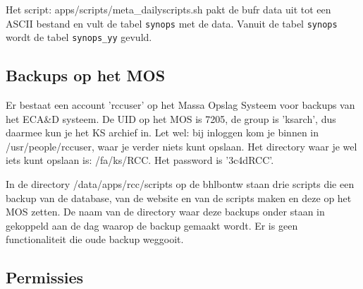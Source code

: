 \documentclass{article}
\begin{document}
Het script: apps/scripts/meta\_dailyscripts.sh pakt de bufr data uit tot een ASCII bestand en vult de tabel \texttt{synops} 
met de data.  Vanuit de tabel \texttt{synops} wordt de tabel \texttt{synops\_yy} gevuld.




\subsection*{Backups op het MOS}
Er bestaat een account 'rccuser' op het Massa Opslag Systeem voor backups van het ECA\&D systeem. 
De UID op het MOS is 7205, de group is 'ksarch', dus daarmee kun je het KS archief in. Let wel: bij inloggen kom je binnen in 
/usr/people/rccuser, waar je verder niets kunt opslaan. Het directory waar je wel iets kunt opslaan is: /fa/ks/RCC.
Het password is '3c4dRCC'. 

In de directory /data/apps/rcc/scripts op de bhlbontw staan drie scripts die een backup van de database, van de website en van de scripts
maken en deze op het MOS zetten. De naam van de directory waar deze backups onder staan in gekoppeld aan de dag waarop de backup gemaakt
wordt. Er is geen functionaliteit die oude backup weggooit.

\subsection*{Permissies}








\end{document}
